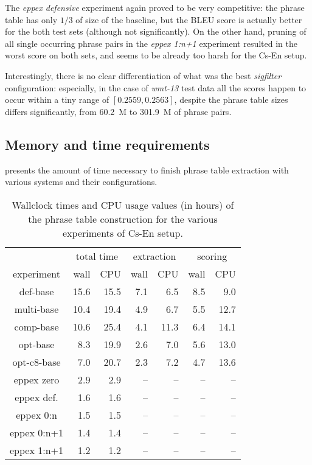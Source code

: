 The \emph{eppex defensive} experiment again proved to be very competitive:
the phrase table has only $1/3$ of size of the baseline,
but the BLEU score is actually better for the both test sets (although not significantly).
On the other hand, pruning of all single occurring phrase pairs in the \emph{eppex 1:n+1}
experiment resulted in the worst score on both sets, and seems to be already
too harsh for the Cs-En setup.

Interestingly, there is no clear differentiation of what was the best \emph{sigfilter}
configuration: especially, in the case of \emph{wmt-13} test data all the scores
happen to occur within a tiny range of $[0.2559, 0.2563]$, despite the phrase table sizes
differs significantly, from 60.2~M to 301.9~M of phrase pairs.

\subsection{Memory and time requirements}

 presents the amount of time necessary to finish
phrase table extraction with various systems and their configurations.

\begin{table}[ht]
\centering
\begin{tabular}{ | c | r r | r r | r r | }
\hline
 & \multicolumn{2}{|c|}{total time} & \multicolumn{2}{|c|}{extraction} & \multicolumn{2}{|c|}{scoring} \\
experiment & wall & CPU & wall & CPU & wall & CPU \\
\hline
\hline
def-base      & 15.6 & 15.5 & 7.1 & 6.5 & 8.5 & 9.0 \\
multi-base    & 10.4 & 19.4 & 4.9 & 6.7 & 5.5 & 12.7 \\
comp-base     & 10.6 & 25.4 & 4.1 & 11.3 & 6.4 & 14.1 \\
opt-base      & 8.3 & 19.9 & 2.6 & 7.0 & 5.6 & 13.0 \\
opt-c8-base   & 7.0 & 20.7 & 2.3 & 7.2 & 4.7 & 13.6 \\
eppex zero    & 2.9 & 2.9 & -- & -- & -- & -- \\
\hline
eppex def.    & 1.6 & 1.6 & -- & -- & -- & -- \\
eppex 0:n     & 1.5 & 1.5 & -- & -- & -- & -- \\
eppex 0:n+1   & 1.4 & 1.4 & -- & -- & -- & -- \\
eppex 1:n+1   & 1.2 & 1.2 & -- & -- & -- & -- \\
\hline
\end{tabular}
\caption{\label{cs-en-wmt13-time-benchmarks}
Wallclock times and CPU usage values (in hours) of the phrase table
construction for the various experiments of Cs-En setup.}
\end{table}

